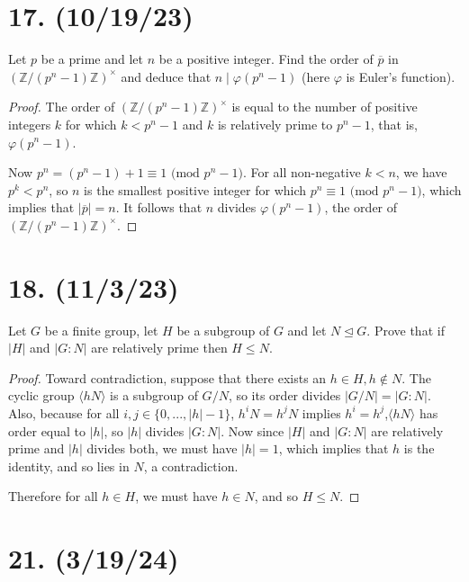 \documentclass{article}
\begin{document}
\section*{17. (10/19/23)}

Let $p$ be a prime and let $n$ be a positive integer. Find the order of $\overline{p}$ in \\ $(\mathbb{Z}/(p^n - 1)\mathbb{Z})^\times$ and deduce that $n \mid \varphi(p^n - 1)$ (here $\varphi$ is Euler's function).

\begin{proof}
    The order of $(\mathbb{Z}/(p^n - 1)\mathbb{Z})^\times$ is equal to the number of positive integers $k$ for which $k < p^n - 1$ and $k$ is relatively prime to $p^n - 1$, that is, $\varphi(p^n - 1)$.

    Now $p^n = (p^n - 1) + 1 \equiv 1 \text{ (mod $p^n - 1$)}$. For all non-negative $k < n$, we have $p^k < p^n$, so $n$ is the smallest positive integer for which $p^n \equiv 1 \text{ (mod $p^n - 1$)}$, which implies that $|\overline{p}| = n$. It follows that $n$ divides $\varphi(p^n - 1)$, the order of $(\mathbb{Z}/(p^n - 1)\mathbb{Z})^\times$.
\end{proof}

\section*{18. (11/3/23)}

Let $G$ be a finite group, let $H$ be a subgroup of $G$ and let $N \unlhd G$. Prove that if $|H|$ and $|G:N|$ are relatively prime then $H \leq N$.

\begin{proof}
    Toward contradiction, suppose that there exists an $h \in H, h \notin N$. The cyclic group $\langle hN \rangle$ is a subgroup of $G/N$, so its order divides $|G/N| = |G:N|$. Also, because for all $i, j \in \{ 0, ..., |h| - 1 \}$, $h^i N = h^j N$ implies $h^i = h^j$,$\langle hN \rangle$ has order equal to $|h|$, so $|h|$ divides $|G:N|$. Now since $|H|$ and $|G:N|$ are relatively prime and $|h|$ divides both, we must have $|h| = 1$, which implies that $h$ is the identity, and so lies in $N$, a contradiction.

    Therefore for all $h \in H$, we must have $h \in N$, and so $H \leq N$.
\end{proof}

\section*{21. (3/19/24)}
\end{document}
